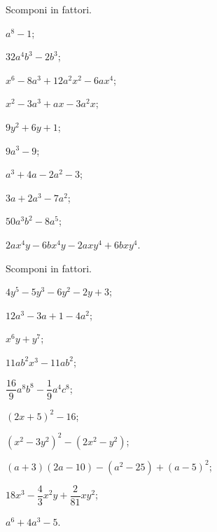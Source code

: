 \begin{esercizio}
 \label{ese:13.115}
 Scomponi in fattori.
\begin{multicols}{2}
 \begin{enumeratea}
\item $a^{{8}}-1$;
\item $32a^{4}b^{3} - 2b^{3}$;
\item $x^{6} - 8a^{3} + 12a^{2}x^{2} - 6ax^{4}$;
\item $x^{2} - 3a^{3} + ax - 3a^{2}x$;
\item $9y^{2}+6y+1$;
\item $9a^{3}-9$;
\item $a^{3}+4a-2a^{2}-3$;
\item $3a+2a^{3}-7a^{2}$;
\item $50a^{3}b^{2}-8a^{5}$;
\item $2ax^{4}y-6bx^{4}y-2axy^{4}+6bxy^{4}$.
 \end{enumeratea}
\end{multicols}
\end{esercizio}

\begin{esercizio}[\Ast]
 \label{ese:13.116}
 Scomponi in fattori.
 \begin{multicols}{2}
 \begin{enumeratea}
\item $4y^{5}-5y^{3}-6y^{2}-2y+3$;
\item $12a^{3}-3a+1-4a^{2}$;
\item $x^{6}y+y^{7}$;
\item $11ab^{2}x^{3}-11ab^{2}$;
\item $\dfrac{16}{9}a^{8}b^{8}-\dfrac{1}{9}a^{4}c^{8}$;
\item $(2x+5)^{2}-16$;
\item $\left(x^{2}-3y^{2}\right)^{2}-\left(2x^{2}-y^{2}\right)$;
\item $(a+3)(2a-10)-\left(a^{2}-25\right)+(a-5)^2$;
\item $18x^{3}-\dfrac{4}{3}x^{2}y+\dfrac{2}{81}xy^{2}$;
\item $a^{6}+4a^{3}-5$.
 \end{enumeratea}
 \end{multicols}
\end{esercizio}

